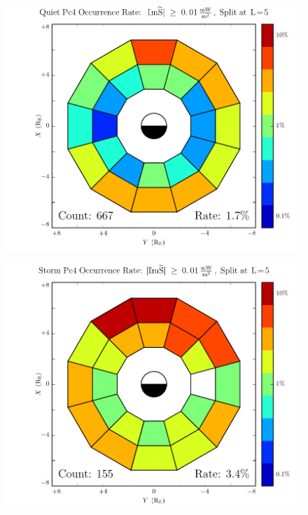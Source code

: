 \begin{figure}[!htb]
    \centering
    \includegraphics[width=\textwidth]{figures/rate_calm.pdf}
    \caption[Pc4 Rate: Dst$\geq \SI{-30}{\nT}$]{
      \todo{$\cdots$}
    }
    \label{fig_rate_calm}
\end{figure}

\begin{figure}[!htb]
    \centering
    \includegraphics[width=\textwidth]{figures/rate_storm.pdf}
    \caption[Pc4 Rate: Dst$< \SI{-30}{\nT}$]{
    }
    \label{fig_rate_storm}
\end{figure}

